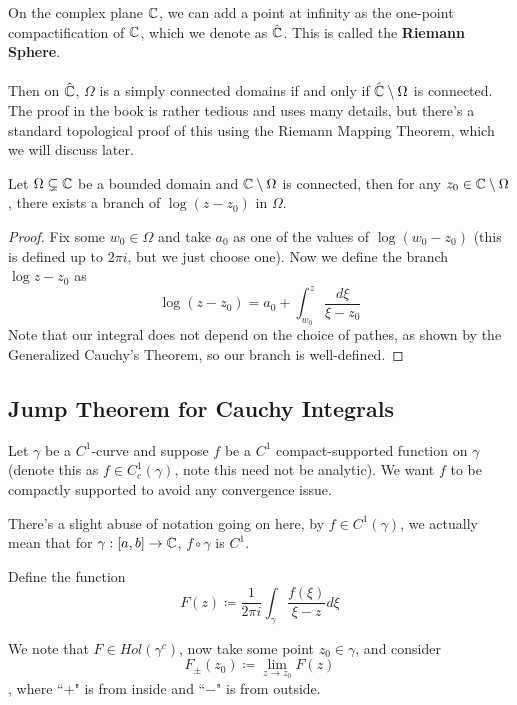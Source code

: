 \begin{remark}
    On the complex plane $\mathbb{C}$, we can add a point at infinity as the one-point compactification of $\mathbb{C}$, which we denote as $\hat{\mathbb{C}}$. This is called the \textbf{Riemann Sphere}.\\\\
    Then on $\hat{\mathbb{C}}$, $\Omega$ is a simply connected domains if and only if $\hat{\mathbb{C}} \setminus \Omega$ is connected. The proof in the book is rather tedious and uses many details, but there's a standard topological proof of this using the Riemann Mapping Theorem, which we will discuss later.
\end{remark}

\begin{corollary}
    Let $\Omega \subsetneq \mathbb{C}$ be a bounded domain and $\mathbb{C} \setminus \Omega$ is connected, then for any $z_0 \in \mathbb{C} \setminus \Omega$, there exists a branch of $\log(z - z_0)$ in $\Omega$.
\end{corollary}

\begin{proof}
    Fix some $w_0 \in \Omega$ and take $a_0$ as one of the values of $\log (w_0 - z_0)$ (this is defined up to $2\pi i$, but we just choose one). Now we define the branch $\log z - z_0$ as
    \[\log(z - z_0) = a_0 + \int_{w_0}^z \frac{d\xi}{\xi - z_0} \]
    Note that our integral does not depend on the choice of pathes, as shown by the Generalized Cauchy's Theorem, so our branch is well-defined.
\end{proof}

\subsection{Jump Theorem for Cauchy Integrals}

Let $\gamma$ be a $C^1$-curve and suppose $f$ be a $C^1$ compact-supported function on $\gamma$ (denote this as $f \in C^1_c(\gamma)$, note this need not be analytic). We want $f$ to be compactly supported to avoid any convergence issue.

There's a slight abuse of notation going on here, by $f \in C^1(\gamma)$, we actually mean that for $\gamma: [a, b] \to \mathbb{C}$, $f \circ \gamma$ is $C^1$.

Define the function
\[F(z) \coloneqq \frac{1}{2\pi i} \int_\gamma \frac{f(\xi)}{\xi - z} d\xi\]

We note that $F \in Hol(\gamma^c)$, now take some point $z_0 \in \gamma$, and consider
\[F_{\pm}(z_0) \coloneqq \lim_{z \to z_0} F(z)\]
, where ``$+$" is from inside and ``$-$" is from outside.\\\\

